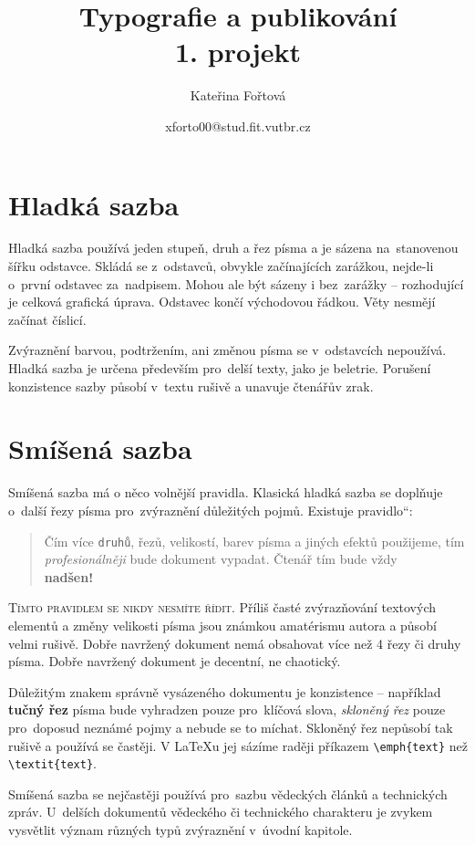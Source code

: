 \documentclass[a4paper,twocolumn]{article}
\title{Typografie a publikování\\1. projekt}
\author{Kateřina Fořtová}
\date{xforto00@stud.fit.vutbr.cz}
\newcommand{\myuv}[1]{\quotedblbase #1\textquotedblleft}
\newcommand{\mycode}[1]{\texttt{#1}}
\begin{document}
\maketitle

\section{Hladká sazba}
Hladká sazba používá jeden stupeň, druh a řez písma a je sázena na~stanovenou šířku odstavce. Skládá se z~odstavců, obvykle začínajících zarážkou, nejde-li o~první odstavec za~nadpisem. Mohou ale být sázeny i bez~zarážky -- rozhodující je celková grafická úprava. Odstavec končí východovou řádkou. Věty nesmějí začínat číslicí.

Zvýraznění barvou, podtržením, ani změnou písma se v~odstavcích nepoužívá. Hladká sazba je určena především pro~delší texty, jako je beletrie. Porušení konzistence sazby působí v~textu rušivě a unavuje čtenářův zrak.

\section{Smíšená sazba}
\label{2}
Smíšená sazba má o něco volnější pravidla. Klasická hladká sazba se doplňuje o~další řezy písma pro~zvýraznění důležitých pojmů. Existuje \myuv{pravidlo}:
\begin{quotation}
Čím více \mycode{druhů}, řezů, \small{velikostí}, barev písma \textup{a jiných efektů} použijeme, tím \emph{profesionálněji} bude dokument vypadat. Čtenář tím {\tiny bude} vždy\\ {\huge\textbf{nadšen!}}
\end{quotation}
{\textsc {Tímto pravidlem se nikdy nesmíte řídit.}} Příliš časté zvýrazňování textových elementů a změny velikosti písma jsou známkou amatérismu autora a působí velmi rušivě. Dobře navržený dokument nemá obsahovat více než
4 řezy či druhy písma. Dobře navržený dokument je decentní, ne chaotický.

Důležitým znakem správně vysázeného dokumentu je konzistence -- například {\textbf {tučný řez}} písma bude vyhradzen pouze pro~klíčová slova, {\emph {skloněný řez}} pouze pro~doposud neznámé pojmy a nebude se to míchat. Skloněný řez nepůsobí tak rušivě a používá se častěji. V \LaTeX{u} jej sázíme raději příkazem \verb|\emph{text}| než \verb|\textit{text}|.

Smíšená sazba se nejčastěji používá pro~sazbu vědeckých článků a technických zpráv. U~delších dokumentů vědeckého či technického charakteru je zvykem vysvětlit význam různých typů zvýraznění v~úvodní kapitole.
\end{document}

